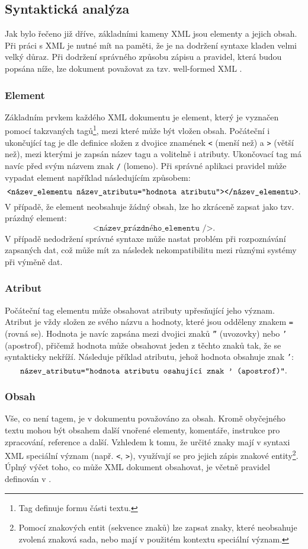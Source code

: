 \subsection{Syntaktická analýza}
\label{syntaxeXml}
Jak bylo řečeno již dříve, základními kameny XML jsou elementy a jejich obsah. Při práci s XML je nutné mít na paměti, že je na dodržení syntaxe kladen velmi velký důraz. Při dodržení správného způsobu zápisu a pravidel, která budou popsána níže, lze dokument považovat za tzv. well-formed XML \cite{w3cxml}.

\subsubsection{Element}
Základním prvkem každého XML dokumentu je element, který je vyznačen pomocí takzvaných tagů\footnote{Tag definuje formu části textu.}, mezi které může být vložen obsah. Počáteční i ukončující tag je dle definice \cite{w3cxml} složen z dvojice znamének \texttt{<} (menší než) a \texttt{>} (větší než), mezi kterými je zapsán název tagu a volitelně i atributy. Ukončovací tag má navíc před svým názvem znak \texttt{/} (lomeno). Při správné aplikaci pravidel může vypadat element například následujícím způsobem:
$$\texttt{<název\_elementu název\_atributu=\textquotedblright hodnota atributu\textquotedblright></název\_elementu>}.$$
V případě, že element neobsahuje žádný obsah, lze ho zkráceně zapsat jako tzv. prázdný element:
$$\texttt{<název\_prázdného\_elementu />}.$$
V případě nedodržení správné syntaxe může nastat problém při rozpoznávání zapsaných dat, což může mít za následek nekompatibilitu mezi různými systémy při výměně dat.

\subsubsection{Atribut}
Počáteční tag elementu může obsahovat atributy upřesňující jeho význam. Atribut je vždy složen ze svého názvu a hodnoty, které jsou odděleny znakem \texttt{=} (rovná se). Hodnota je navíc zapsána mezi dvojici znaků \texttt{\textquotedblright} (uvozovky) nebo \texttt{\textquoteright} (apostrof), přičemž hodnota může obsahovat jeden z těchto znaků tak, že se syntakticky nekříží. Následuje příklad atributu, jehož hodnota obsahuje znak \texttt{\textquoteright}:
$$\texttt{název\_atributu=\textquotedblright hodnota atributu osahující znak \textquoteright\ (apostrof)\textquotedblright}.$$

\subsubsection{Obsah}
Vše, co není tagem, je v dokumentu považováno za obsah. Kromě obyčejného textu mohou být obsahem další vnořené elementy, komentáře, instrukce pro zpracování, reference a další. Vzhledem k tomu, že určité znaky mají v syntaxi XML speciální význam (např. \texttt{<}, \texttt{>}), využívají se pro jejich zápis znakové entity\footnote{Pomocí znakových entit (sekvence znaků) lze zapsat znaky, které neobsahuje zvolená znaková sada, nebo mají v použitém kontextu speciální význam.}. Úplný výčet toho, co může XML dokument obsahovat, je včetně pravidel definován v \cite{w3cxml}.

